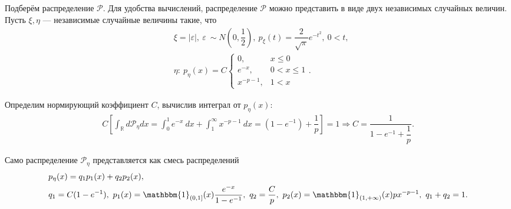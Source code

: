\documentclass{article}
\DeclareMathOperator\R{\mathbb{R}}
\begin{document}
	\subsection{}
	

	Подберём распределение $\mathcal{P}$. Для удобства вычислений, распределение $\mathcal{P}$ можно представить в виде двух независимых случайных величин. Пусть $\xi, \eta$ --- независимые случайные величины такие, что 
	\begin{align*}
		&\xi=|\varepsilon|,~\varepsilon~\sim N\left(0, \dfrac{1}{2}\right),~p_\xi(t)=\dfrac{2}{\sqrt{\pi}}e^{-t^2},~0<t,\\
		&\eta:~p_\eta(x)=C\begin{cases}
			0,&x\leqslant0\\
			e^{-x},&0<x\leqslant1\\
			x^{-p-1},&1<x
		\end{cases}.
	\end{align*}
	
	Определим нормирующий коэффициент $C$, вычислив интеграл от $p_\eta(x)$:
	\begin{align*}
		C\left[\int_{\R} d\mathcal{P}_\eta{dx}=\int_0^1e^{-x}~dx+\int_1^\infty x^{-p-1}~dx=(1-e^{-1}) + \dfrac{1}{p}\right]=1\Rightarrow C = \dfrac{1}{1-e^{-1}+\dfrac{1}{p}}.
	\end{align*}
	
	Само распределение $\mathcal{P}_\eta$ представляется как смесь распределений
	\begin{align*}
		&p_\eta(x)=q_1p_1(x)+q_2p_2(x),\\
		&q_1=C(1-e^{-1}),~p_1(x)= \mathbbm{1}_{(0,1]}(x)\dfrac{e^{-x}}{1-e^{-1}},~q_2=\dfrac{C}{p},~p_2(x)=\mathbbm{1}_{(1,+\infty)}(x)px^{-p-1},~q_1+q_2=1.
	\end{align*}
	
\end{document}
